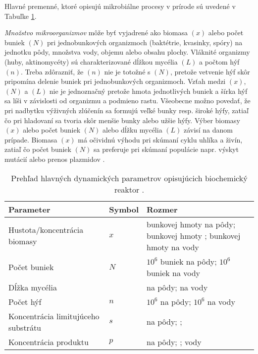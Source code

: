 Hlavné premenné, ktoré opisujú mikrobiálne procesy v prírode sú uvedené v Tabuľke \ref{tab: 1}.

\textit{Množstvo mikroorganizmov} môže byť vyjadrené ako biomasa $(x)$ alebo počet buniek $(N)$ pri jednobunkových organizmoch (baktétrie, kvasinky, spóry) na jednotku pôdy, množstva vody, objemu alebo obsahu plochy. Vláknité organizmy (huby, aktinomycéty) sú charakterizované dĺžkou mycélia $(L)$ a počtom hýf $(n)$. Treba zdôrazniť, že $(n)$ nie je totožné s $(N)$, pretože vetvenie hýf skôr pripomína delenie buniek pri jednobunkových organizmoch. Vzťah medzi $(x)$, $(N)$ a $(L)$ nie je jednoznačný pretože hmota jednotlivých buniek a šírka hýf sa líši v závislosti od organizmu a podmieno rastu. 
Všeobecne možno povedať, že pri nadbytku výživných zlúčenín sa formujú veľké bunky resp. široké hýfy, zatiaľ čo pri hladovaní sa tvoria skôr menšie bunky alebo užšie hýfy. Výber biomasy $(x)$ alebo počet buniek $(N)$ alebo dĺžku mycélia $(L)$ závisí na danom prípade. Biomasa $(x)$ má očividnú výhodu pri skúmaní cyklu uhlíka a živín, zatiaľ čo počet buniek $(N)$ sa preferuje pri skúmaní populácie napr. výskyt mutácií alebo prenos plazmidov \cite{ref2}.

\begin{table}
	\centering
	\caption{Prehľad hlavných dynamických parametrov opisujúcich biochemický reaktor \cite{ref2}.}
	\label{tab: 1}
	\begin{tabular}{p{5cm} p{1.9cm} p{4cm}}
		\hline
		\textbf{Parameter} & \textbf{Symbol} & \textbf{Rozmer} \\ 
		\hline
		Hustota/koncentrácia biomasy & $x$ & \micg bunkovej hmoty na \gram pôdy; \gram bunkovej hmoty \unitfrac{1}{\squaremeter}; \micg bunkovej hmoty na \ml vody\\
		Počet buniek & $N$ & $10^{6}$ buniek na \gram pôdy; $10^{6}$ buniek na \ml vody\\
		Dĺžka mycélia & \liter & \meter na \gram pôdy; \meter na \ml vody\\
		Počet hýf & $n$ & $10^{6}$ na \gram pôdy; $10^{6}$ na \ml vody\\
		Koncentrácia limitujúceho substrátu & $s$ & \milligram na \gram pôdy; \unitfrac{\gram}{\squaremeter};\unitfrac{\gram}{\liter vody}\\
		Koncentrácia produktu & $p$ & \milligram na \gram pôdy; \unitfrac{\gram}{\squaremeter}; \unitfrac{\gram}{\liter} vody\\
		\hline	
	\end{tabular}
\end{table}

